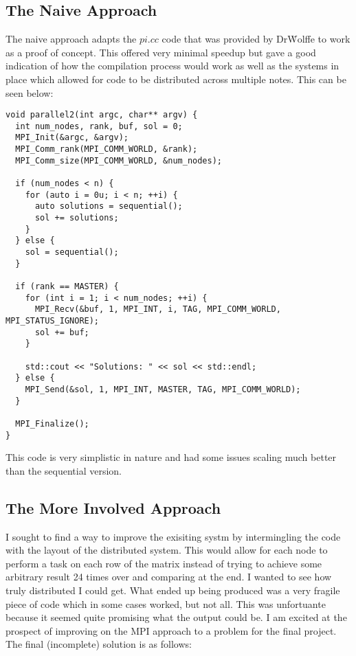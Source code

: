 \documentclass[11pt]{article}
\begin{document}
\subsection{The Naive Approach}
The naive approach adapts the $pi.cc$ code that was provided by Dr\. Wolffe to work as a proof of concept. This offered very minimal speedup but gave a good indication of how
the compilation process would work as well as the systems in place which allowed for code to be distributed across multiple notes. This can be seen below:
\lstset{frame=tb,language=c++}
\begin{lstlisting}
void parallel2(int argc, char** argv) {
  int num_nodes, rank, buf, sol = 0;
  MPI_Init(&argc, &argv);
  MPI_Comm_rank(MPI_COMM_WORLD, &rank);
  MPI_Comm_size(MPI_COMM_WORLD, &num_nodes);

  if (num_nodes < n) {
    for (auto i = 0u; i < n; ++i) {
      auto solutions = sequential();
      sol += solutions;
    }
  } else {
    sol = sequential();
  }

  if (rank == MASTER) {
    for (int i = 1; i < num_nodes; ++i) {
      MPI_Recv(&buf, 1, MPI_INT, i, TAG, MPI_COMM_WORLD, MPI_STATUS_IGNORE);
      sol += buf;
    }

    std::cout << "Solutions: " << sol << std::endl;
  } else {
    MPI_Send(&sol, 1, MPI_INT, MASTER, TAG, MPI_COMM_WORLD);
  }

  MPI_Finalize();
}
\end{lstlisting}
This code is very simplistic in nature and had some issues scaling much better than the sequential version.

\subsection{The More Involved Approach}
I sought to find a way to improve the exisiting systm by intermingling the code with the layout of the distributed system. This would allow for each node to perform a task on each row of the matrix instead of trying to achieve some arbitrary result 24 times over and comparing at the end. I wanted to see how truly distributed I could get. What ended up being produced was a very fragile piece of code which in some cases worked, but not all. This was unfortuante because it seemed quite promising what the output could be. I am excited at the prospect of improving on the MPI approach to a problem for the final project. The final (incomplete) solution is as follows:
\end{document}
